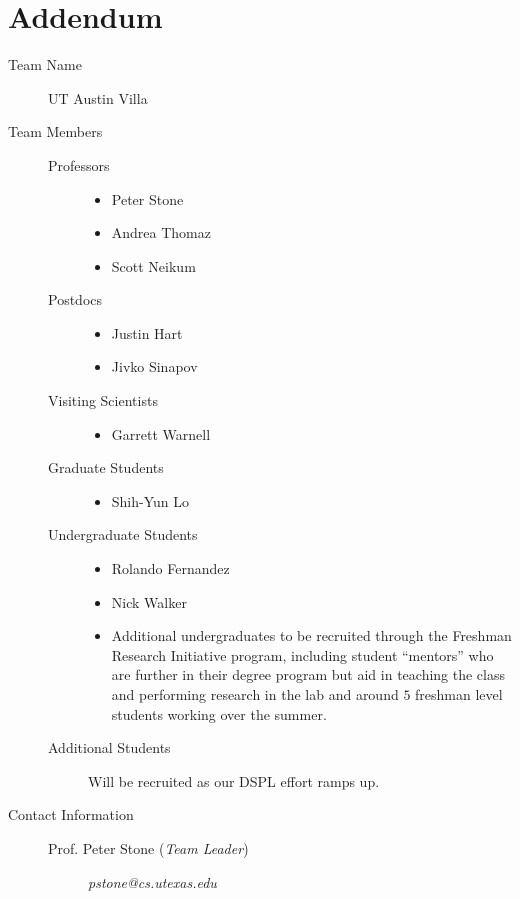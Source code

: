 \section*{Addendum}
\begin{description}
\item[Team Name] UT Austin Villa
\item[Team Members]\hfill
\begin{description}
\item[Professors]\hfill
\begin{itemize}
\item Peter Stone
\item Andrea Thomaz
\item Scott Neikum
\end{itemize}
\item[Postdocs]\hfill
\begin{itemize}
\item Justin Hart
\item Jivko Sinapov
\end{itemize}
\item[Visiting Scientists]\hfill
\begin{itemize}
\item Garrett Warnell
\end{itemize}
\item[Graduate Students]\hfill
\begin{itemize}
\item Shih-Yun Lo
\end{itemize}
\item[Undergraduate Students]\hfill
\begin{itemize}
\item Rolando Fernandez
\item Nick Walker
\item Additional undergraduates to be recruited through the Freshman Research Initiative program, including student ``mentors'' who are further in their degree program but aid in teaching the class and performing research in the lab and around $5$ freshman level students working over the summer.
\end{itemize}
\item[Additional Students] Will be recruited as our DSPL effort ramps up.
\end{description}
\item[Contact Information]\hfill
\begin{description}
\item[Prof. Peter Stone (\textit{Team Leader})] \textit{pstone@cs.utexas.edu }

\end{description}
\end{description}
